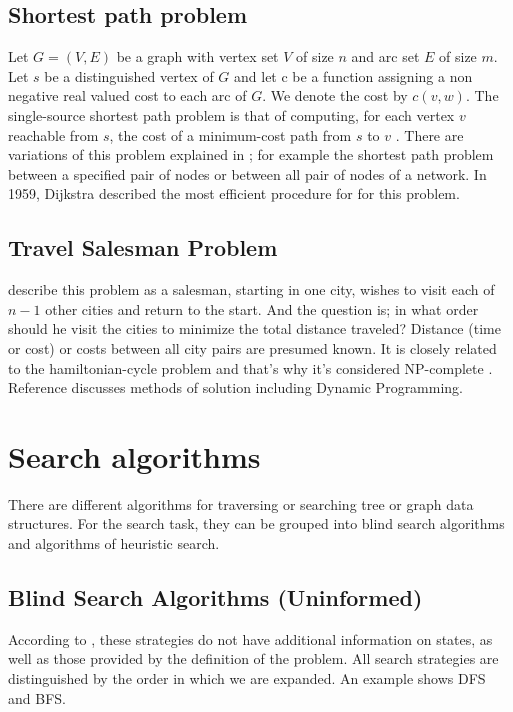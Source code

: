 \documentclass[12pt]{article}
\begin{document}
    \subsection{Shortest path problem}
    Let $G =  (V, E)$ be a graph with  vertex  set $V$ of size $n$ and arc set $E$ of size $m$. Let $s$ be a distinguished  vertex  of $G$ and let c be a function  assigning a non negative  real valued cost to each arc of $G$. We denote the cost by $c(v,w)$. The single-source shortest path problem is that  of computing, for each vertex  $v$ reachable from  $s$, the cost of a minimum-cost  path  from  $s$ to  $v$ \cite{ahuja1990faster}. 
    There are variations of this problem explained in \cite{dreyfus1969appraisal}; for example the shortest path problem between a specified pair of nodes or between all pair of nodes of a network. In 1959, Dijkstra \cite{dijkstra1959note} described the most efficient procedure for for this problem. 
    
    \subsection{Travel Salesman Problem}
    \cite{little1963algorithm} describe this problem as a salesman, starting in one city, wishes to visit each of $n-1$ other cities and return to the start. And the question is; in what order should he visit the cities to minimize the total distance traveled? Distance (time or cost) or costs between all city pairs are presumed known.
    It is closely related to the hamiltonian-cycle problem and that's why it's considered NP-complete \cite{cormen2009introduction}. Reference \cite{bellmore1968traveling} discusses methods of solution including Dynamic Programming.

\section{Search algorithms}
There are different algorithms for traversing or searching tree or graph data structures. For the search task, they can be grouped into blind search algorithms and algorithms of heuristic search.

    \subsection{Blind Search Algorithms (Uninformed)}
    According to \cite{russell2004inteligencia}, these strategies do not have additional information on states, as well as those provided by the definition of the problem. All search strategies are distinguished by the order in which we are expanded. An example shows DFS and BFS.
\end{document}
